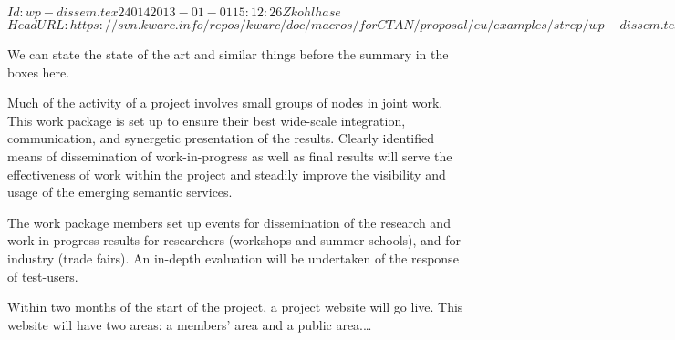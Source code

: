 \svnInfo $Id: wp-dissem.tex 24014 2013-01-01 15:12:26Z kohlhase $
\svnKeyword $HeadURL: https://svn.kwarc.info/repos/kwarc/doc/macros/forCTAN/proposal/eu/examples/strep/wp-dissem.tex $
\begin{workpackage}%
[id=dissem,type=RTD,lead=efo,
 wphases=10-24!1,
 title=Dissemination and Exploitation,short=Dissemination,
 efoRM=8,jacuRM=2,barRM=2,bazRM=2]
We can state the state of the art and similar things before the summary in the boxes
here. 
\wpheadertable

\begin{wpobjectives}
  Much of the activity of a project involves small groups of nodes in joint work. This
  work package is set up to ensure their best wide-scale integration, communication, and
  synergetic presentation of the results. Clearly identified means of dissemination of
  work-in-progress as well as final results will serve the effectiveness of work within
  the project and steadily improve the visibility and usage of the emerging semantic
  services.
\end{wpobjectives}

\begin{wpdescription}
  The work package members set up events for dissemination of the research and
  work-in-progress results for researchers (workshops and summer schools), and for
  industry (trade fairs). An in-depth evaluation will be undertaken of the response of
  test-users.

  Within two months of the start of the project, a project website will go live. This
  website will have two areas: a members' area and a public area.\ldots
\end{wpdescription}


\end{workpackage}
